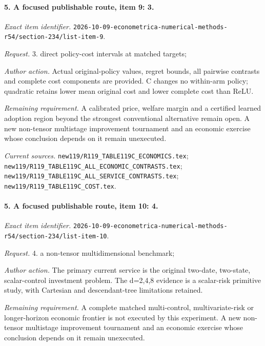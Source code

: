 \paragraph{5. A focused publishable route, item 9: 3.}

\emph{Exact item identifier.} \nolinkurl{2026-10-09-econometrica-numerical-methods-r54/section-234/list-item-9}.

\par\emph{Request.} 3. direct policy-cost intervals at matched targets;

\par\emph{Author action.} Actual original-policy values, regret bounds, all pairwise contrasts and complete cost components are provided. C changes no within-arm policy; quadratic retains lower mean original cost and lower complete cost than ReLU.

\par\emph{Remaining requirement.} A calibrated price, welfare margin and a certified learned adoption region beyond the strongest conventional alternative remain open. A new non-tensor multistage improvement tournament and an economic exercise whose conclusion depends on it remain unexecuted.

\par\emph{Current sources.} \nolinkurl{new119/R119_TABLE119C_ECONOMICS.tex}; \nolinkurl{new119/R119_TABLE119C_ALL_ECONOMIC_CONTRASTS.tex}; \nolinkurl{new119/R119_TABLE119C_ALL_SERVICE_CONTRASTS.tex}; \nolinkurl{new119/R119_TABLE119C_COST.tex}.

\paragraph{5. A focused publishable route, item 10: 4.}

\emph{Exact item identifier.} \nolinkurl{2026-10-09-econometrica-numerical-methods-r54/section-234/list-item-10}.

\par\emph{Request.} 4. a non-tensor multidimensional benchmark;

\par\emph{Author action.} The primary current service is the original two-date, two-state, scalar-control investment problem. The d=2,4,8 evidence is a scalar-risk primitive study, with Cartesian and descendant-tree limitations retained.

\par\emph{Remaining requirement.} A complete matched multi-control, multivariate-risk or longer-horizon economic frontier is not executed by this experiment. A new non-tensor multistage improvement tournament and an economic exercise whose conclusion depends on it remain unexecuted.

